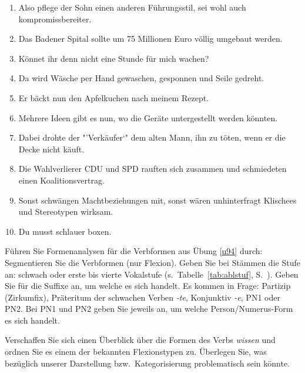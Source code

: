 \begin{sloppypar}
\begin{enumerate}\Lf
  \item Also pflege der Sohn einen anderen Führungsstil, sei wohl auch kompromissbereiter.
  \item Das Badener Spital sollte um 75 Millionen Euro völlig umgebaut werden.
  \item Könnet ihr denn nicht eine Stunde für mich wachen?
  \item Da wird Wäsche per Hand gewaschen, gesponnen und Seile gedreht.
  \item Er bäckt nun den Apfelkuchen nach meinem Rezept.
  \item Mehrere Ideen gibt es nun, wo die Geräte untergestellt werden könnten.
  \item Dabei drohte der "'Verkäufer`" dem alten Mann, ihn zu töten, wenn er die Decke nicht käuft.
  \item Die Wahlverlierer CDU und SPD rauften sich zusammen und schmiedeten einen Koalitionsvertrag.
  \item Sonst schwängen Machtbeziehungen mit, sonst wären unhinterfragt Klischees und Stereotypen wirksam.
  \item Du musst schlauer boxen.
\end{enumerate}

\Uebung \label{u95} Führen Sie Formenanalysen für die Verbformen aus Übung \ref{u94} durch:
Segmentieren Sie die Verbformen (nur Flexion).
Geben Sie bei Stämmen die Stufe an: schwach oder erste bis vierte Vokalstufe (s.\ Tabelle~\ref{tab:ablstuf}, S.~\pageref{tab:ablstuf}).
Geben Sie für die Suffixe an, um welche es sich handelt.
Es kommen in Frage: Partizip (Zirkumfix), Präteritum der schwachen Verben \textit{-te}, Konjunktiv \textit{-e}, PN1 oder PN2.
Bei PN1 und PN2 geben Sie jeweils an, um welche Person/Numerus-Form es sich handelt.

\Uebung[\tristar] \label{u96} Verschaffen Sie sich einen Überblick über die Formen des Verbs \textit{wissen} und ordnen Sie es einem der bekannten Flexionstypen zu.
Überlegen Sie, was bezüglich unserer Darstellung bzw.\ Kategorisierung problematisch sein könnte.

\end{sloppypar}

\WeitereLiteratur

